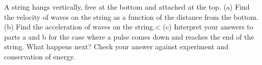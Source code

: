 A string hangs vertically, free at the bottom and attached at the top.\hwendpart
(a) Find the velocity of waves on the string as a function of the distance
from the bottom.\answercheck\hwendpart
(b) Find the acceleration of waves on the string.<%
(c) Interpret your answers to parts a and b for the case where a pulse comes
down and reaches the end of the string. What happens next? Check your answer
against experiment and conservation of energy.
